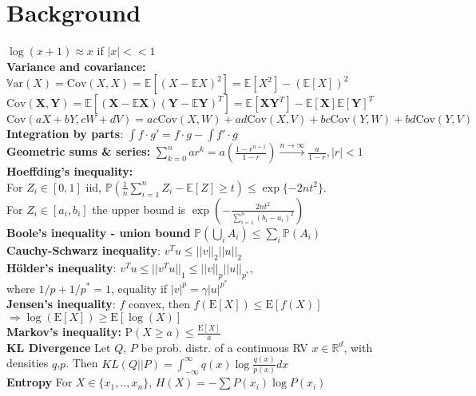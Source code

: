 \section*{Background}
$\log(x+1)\approx x$ if $|x|<<1$ \\
\textbf{Variance and covariance:}\\
$\mathbb{V}\text{ar}(X) = \text{Cov}(X,X) = \mathbb{E}[ (X - \mathbb{E}X)^2] = \mathbb{E}[X^2] - (\mathbb{E}[X])^2$ \\
$\text{Cov}(\mathbf X, \mathbf Y)=\mathbb E[(\mathbf X - \mathbb E\mathbf X)(\mathbf Y - \mathbb E\mathbf Y)^T]=\mathbb E[\mathbf{XY}^T]-\mathbb E[\mathbf X]\mathbb E[\mathbf Y]^T$\\
$\text{Cov}(aX+bY,cW+dV)=ac\text{Cov}(X,W)+ad\text{Cov}(X,V)+bc\text{Cov}(Y,W)+bd\text{Cov}(Y,V)$\\
\textbf{Integration by parts}: $\int f \cdot g' = f\cdot g - \int f' \cdot g$\\
\textbf{Geometric sums \& series:} $\sum_{k=0}^nar^k=a(\frac{1-r^{n+1}}{1-r})\overset{n\rightarrow\infty}{\longrightarrow}\frac{a}{1-r}, |r|<1$\\
\textbf{Hoeffding's inequality: }\\ For $Z_i \in [0,1]$ iid, 
$\mathbb P(\frac{1}{n}\sum_{i=1}^n Z_i - \mathbb E[Z]\geq t)\leq\exp\{-2n t^2\}$. \\
For $Z_i \in [a_i,b_i]$ the upper bound is $\exp(-\frac{2nt^2}{\sum_{i=1}^n(b_i -a_i)^2})$\\
\textbf{Boole's inequality - union bound} $\mathbb{P}\left(\underset{i}{\bigcup} A_i \right) \leq \underset{i}{\sum} \mathbb{P}(A_i)$ \\
\textbf{Cauchy-Schwarz inequality}: $v^Tu\leq||v||_2||u||_2$\\
\textbf{Hölder's inequality}: $v^Tu\leq ||v^Tu||_1\leq||v||_{p}||u||_{p^*}$, \\ where $1/p+1/p^*=1$, equality if $|v|^p=\gamma|u|^{p^*}$\\
\textbf{Jensen's inequality}: $f$ convex, then $f(\mathrm E[X])\leq\mathrm E[f(X)]$\\
$\Rightarrow \log(\mathrm E[X])\geq\mathrm E[\log(X)]$ \\
\textbf{Markov's inequality:} $\mathrm P(X\geq a)\leq\frac{\mathrm E[X]}{a}$\\
\textbf{KL Divergence} Let $Q$, $P$ be prob. distr. of a continuous RV $x \in \mathbb{R}^d$, with densities $q$,$p$. Then  $KL(Q || P) = \int_{-\infty}^{\infty} q(x)\log \frac{q(x)}{p(x)}dx$\\
\textbf{Entropy} For $X \in \{x_1,..,x_n \}$, $H(X) = - \sum P(x_i)\log P(x_i) $

